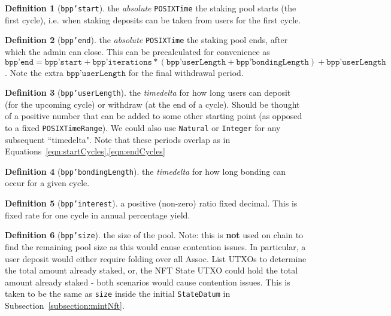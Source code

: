 \documentclass[10pt, a4paper]{article}
\theoremstyle{definition}
\newtheorem{definition}{Definition}[section]
\begin{document}
\begin{definition}[\texttt{bpp'start}]\label{def:bpp'start}
the \textit{absolute} \texttt{POSIXTime} the staking pool starts (the first cycle), i.e. when staking deposits can be taken from users for the first cycle.
\end{definition}

\begin{definition}[\texttt{bpp'end}]\label{def:bpp'end}
the \textit{absolute} \texttt{POSIXTime} the staking pool ends, after which the admin can close. This can be precalculated for convenience as $\texttt{bpp'end} = \texttt{bpp'start} +   \texttt{bpp'iterations} * (\texttt{bpp'userLength} + \texttt{bpp'bondingLength}) + \texttt{bpp'userLength}$. Note the extra $\texttt{bpp'userLength}$ for the final withdrawal period.
\end{definition}

\begin{definition}[\texttt{bpp'userLength}]\label{def:bpp'userLength}
the \textit{timedelta} for how long users can deposit (for the upcoming cycle) or withdraw (at the end of a cycle). Should be thought of a positive number that can be added to some other starting point (as opposed to a fixed \texttt{POSIXTimeRange}). We could also use \texttt{Natural} or \texttt{Integer} for any subsequent ``timedelta". Note that these periods overlap as in Equations~\ref{eqn:startCycles},\ref{eqn:endCycles}
\end{definition}

\begin{definition}[\texttt{bpp'bondingLength}]\label{def:bpp'bondingLength}
the \textit{timedelta} for how long bonding can occur for a given cycle.
\end{definition}

\begin{definition}[\texttt{bpp'interest}]\label{def:bpp'interest}
a positive (non-zero) ratio fixed decimal. This is fixed rate for one cycle in annual percentage yield.
\end{definition}

\begin{definition}[\texttt{bpp'size}]\label{def:bpp'size}
the size of the pool. Note: this is \textbf{not} used on chain to find the remaining pool size as this would cause contention issues. In particular, a user deposit would either require folding over all Assoc. List UTXOs to determine the total amount already staked, or, the NFT State UTXO could hold the total amount already staked - both scenarios would cause contention issues. This is taken to be the same as \texttt{size} inside the initial \texttt{StateDatum} in Subsection~\ref{subsection:mintNft}.
\end{definition}
\end{document}
